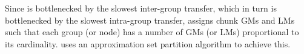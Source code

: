 

Since \ha is bottlenecked by the slowest inter-group transfer, which in turn is bottlenecked by the slowest intra-group transfer, \ha assigns chunk GMs and LMs such that each group (or node) has a number of GMs (or LMs) proportional to its cardinality. \ha uses an approximation set partition algorithm to achieve this. %



